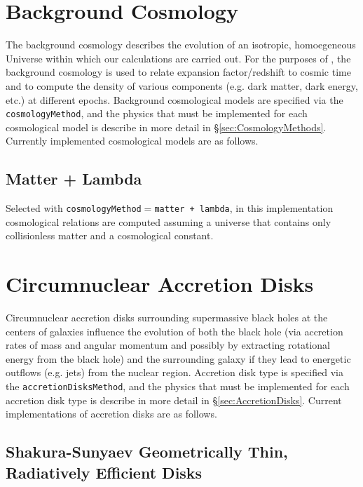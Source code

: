 \section{Background Cosmology}

The background cosmology describes the evolution of an isotropic, homoegeneous Universe within which our calculations are carried out. For the purposes of \glc, the background cosmology is used to relate expansion factor/redshift to cosmic time and to compute the density of various components (e.g. dark matter, dark energy, etc.) at different epochs. Background cosmological models are specified via the {\tt cosmologyMethod}, and the physics that must be implemented for each cosmological model is describe in more detail in \S\ref{sec:CosmologyMethods}. Currently implemented cosmological models are as follows.

\subsection{Matter + Lambda}

Selected with {\tt cosmologyMethod}$=${\tt matter + lambda}, in this implementation cosmological relations are computed assuming a universe that contains only collisionless matter and a cosmological constant.


\section{Circumnuclear Accretion Disks}\label{sec:CircumnuclearDisks}

Circumnuclear accretion disks surrounding supermassive black holes at the centers of galaxies influence the evolution of both the black hole (via accretion rates of mass and angular momentum and possibly by extracting rotational energy from the black hole) and the surrounding galaxy if they lead to energetic outflows (e.g. jets) from the nuclear region. Accretion disk type is specified via the {\tt accretionDisksMethod}, and the physics that must be implemented for each accretion disk type is describe in more detail in \S\ref{sec:AccretionDisks}. Current implementations of accretion disks are as follows.

\subsection{Shakura-Sunyaev Geometrically Thin, Radiatively Efficient Disks}

